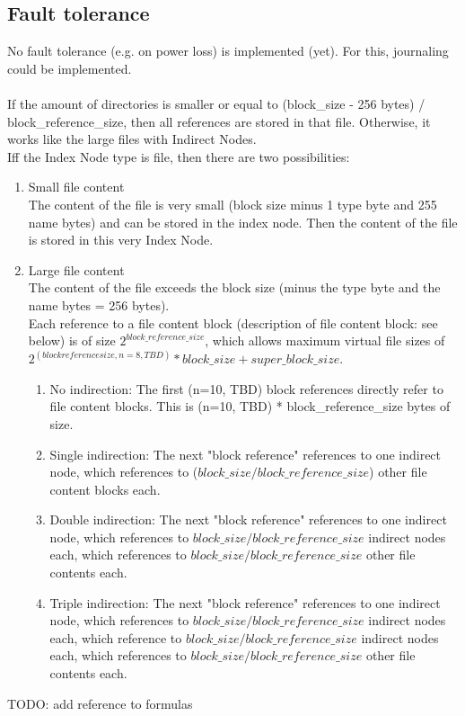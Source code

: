 \subsection{Fault tolerance}

No fault tolerance (e.g. on power loss) is implemented (yet). For this, journaling could be implemented.\\
\\







If the amount of directories is smaller or equal to (block\_size - 256 bytes) / block\_reference\_size, 
then all references are stored in that file. Otherwise, it works like the large files with Indirect Nodes.\\


Iff the Index Node type is file, then there are two possibilities:

\begin{enumerate}
  \item Small file content\\
  The content of the file is very small (block size minus 1 type byte and 255 name bytes) and can be stored in the index node. Then the content of the file is stored in this very Index Node.
  \item Large file content\\
The content of the file exceeds the block size (minus the type byte and the name bytes = 256 bytes).\\
Each reference to a file content block (description of file content block: see below) is of size $2^{block\_reference\_size}$, which allows maximum virtual file sizes of $2^{(block reference size, n=8, TBD)} * block\_size + super\_block\_size$.\\
\begin{enumerate}
  \item No indirection: The first (n=10, TBD) block references directly refer to file content blocks. This is (n=10, TBD) * block\_reference\_size bytes of size.
  \item Single indirection: The next "block reference" references to one indirect node, which references to ($block\_size / block\_reference\_size$) other file content blocks each.
  \item Double indirection: The next "block reference" references to one indirect node, which references to $block\_size / block\_reference\_size$ indirect nodes each, which references to $block\_size / block\_reference\_size$ other file contents each.
  \item Triple indirection: The next "block reference" references to one indirect node, which references to $block\_size / block\_reference\_size$ indirect nodes each, which reference to $block\_size / block\_reference\_size$ indirect nodes each, which references to $block\_size / block\_reference\_size$ other file contents each.
\end{enumerate}
\end{enumerate}

TODO: add reference to formulas\\
